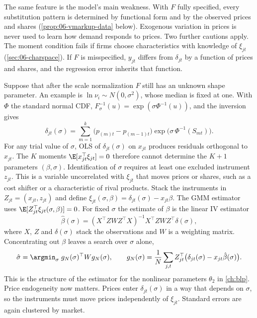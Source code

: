 The same feature is the model's main weakness. With $F$ fully specified, every substitution pattern is
determined by functional form and by the observed prices and shares (\cref{prop:06-vmarkup-data} below).
Exogenous variation in prices is never used to learn how demand responds to prices. Two further cautions
apply. The moment condition fails if firms choose characteristics with knowledge of $\xi_{jt}$
(\cref{sec:06-charspace}). If $F$ is misspecified, $y_{jt}$ differs from $\delta_{jt}$ by a function of
prices and shares, and the regression error inherits that function.

\begin{remark}\label{rem:06-vshape}
Suppose that after the scale normalization $F$ still has an unknown shape parameter. An example is
$\ln\nu_i \sim N(0, \sigma^2)$, whose median is fixed at one. With $\Phi$ the standard normal CDF,
$F_\sigma^{-1}(u) = \exp(\sigma\Phi^{-1}(u))$, and the inversion gives
\begin{equation*}
  \delta_{jt}(\sigma) = \sum_{m=1}^{k}\big(p_{(m)t} - p_{(m-1)t}\big)\exp\big(\sigma\,\Phi^{-1}(S_{mt})\big).
\end{equation*}
For any trial value of $\sigma$, OLS of $\delta_{jt}(\sigma)$ on $x_{jt}$ produces residuals orthogonal to
$x_{jt}$. The $K$ moments $\E[x_{jt}^\top\xi_{jt}] = 0$ therefore cannot determine the $K + 1$ parameters
$(\beta, \sigma)$. Identification of $\sigma$ requires at least one excluded instrument $z_{jt}$. This is a variable
uncorrelated with $\xi_{jt}$ that moves prices or shares, such as a cost shifter or a characteristic of
rival products. Stack the instruments in $Z_{jt} = (x_{jt}, z_{jt})$ and define
$\xi_{jt}(\sigma, \beta) = \delta_{jt}(\sigma) - x_{jt}\beta$. The GMM estimator uses
$\E[Z_{jt}^\top\xi_{jt}(\sigma,\beta)] = 0$. For fixed $\sigma$ the estimate of $\beta$ is the linear IV
estimator
\begin{equation*}
  \hat\beta(\sigma) = (X^\top Z W Z^\top X)^{-1} X^\top Z W Z^\top\delta(\sigma),
\end{equation*}
where $X$, $Z$ and $\delta(\sigma)$ stack the observations and $W$ is a weighting matrix. Concentrating out
$\beta$ leaves a search over $\sigma$ alone,
\begin{equation*}
  \hat\sigma = \argmin_{\sigma}\; g_N(\sigma)^\top W g_N(\sigma), \qquad
  g_N(\sigma) = \frac{1}{N}\sum_{j,t} Z_{jt}^\top\big(\delta_{jt}(\sigma) - x_{jt}\hat\beta(\sigma)\big).
\end{equation*}
This is the structure of the estimator for the nonlinear parameters $\theta_2$ in \cref{ch:blp}. Price
endogeneity now matters. Prices enter $\delta_{jt}(\sigma)$ in a way that depends on $\sigma$, so the
instruments must move prices independently of $\xi_{jt}$. Standard errors are again clustered by market.
\end{remark}

